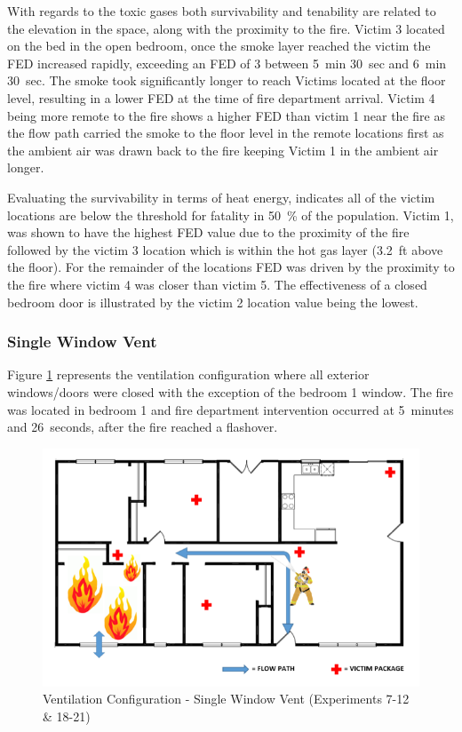 \documentclass[12pt,oneside]{book}
\begin{document}
With regards to the toxic gases both survivability and tenability are related to the elevation in the space, along with the proximity to the fire. Victim 3 located on the bed in the open bedroom, once the smoke layer reached the victim the FED increased rapidly, exceeding an FED of 3 between 5~min 30~sec and 6~min 30~sec. The smoke took significantly longer to reach Victims located at the floor level, resulting in a lower FED at the time of fire department arrival. Victim 4 being more remote to the fire shows a higher FED than victim 1 near the fire as the flow path carried the smoke to the floor level in the remote locations first as the ambient air was drawn back to the fire keeping Victim 1 in the ambient air longer. 

Evaluating the survivability in terms of heat energy, indicates all of the victim locations are below the threshold for fatality in 50~\% of the population. Victim 1,  was shown to have the highest FED value due to the proximity of the fire followed by the victim 3 location which is within the hot gas layer (3.2~ft above the floor). For the remainder of the locations FED was driven by the proximity to the fire where victim 4 was closer than victim 5. The effectiveness of a closed bedroom door is illustrated by the victim 2 location value being the lowest. 

\subsubsection{Single Window Vent}

Figure \ref{fig:Vent_Profile-Single_Vent} represents the ventilation configuration where all exterior windows/doors were closed with the exception of the bedroom 1 window. The fire was located in bedroom 1 and fire department intervention occurred at 5~minutes and 26~seconds, after the fire reached a flashover. 

\begin{figure}[H]
	\centering
	\includegraphics[width=.65\textwidth]{../0_Images/Ventilation_Configurations/Single_Vent.png}
	\caption{Ventilation Configuration - Single Window Vent (Experiments 7-12 \& 18-21)}
	\label{fig:Vent_Profile-Single_Vent}
\end{figure}
\end{document}
